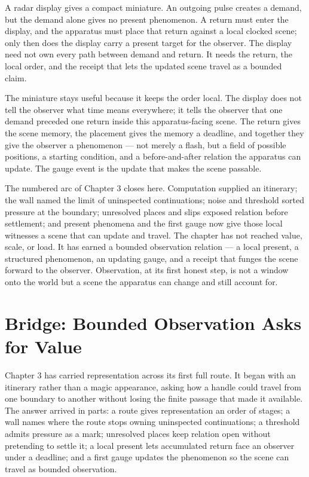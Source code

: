 A radar display gives a compact miniature. An outgoing pulse creates a demand, but the demand alone gives no present phenomenon. A return must enter the display, and the apparatus must place that return against a local clocked scene; only then does the display carry a present target for the observer. The display need not own every path between demand and return. It needs the return, the local order, and the receipt that lets the updated scene travel as a bounded claim.

The miniature stays useful because it keeps the order local. The display does not tell the observer what time means everywhere; it tells the observer that one demand preceded one return inside this apparatus-facing scene. The return gives the scene memory, the placement gives the memory a deadline, and together they give the observer a phenomenon --- not merely a flash, but a field of possible positions, a starting condition, and a before-and-after relation the apparatus can update. The gauge event is the update that makes the scene passable.

The numbered arc of Chapter 3 closes here. Computation supplied an itinerary; the wall named the limit of uninspected continuations; noise and threshold sorted pressure at the boundary; unresolved places and slips exposed relation before settlement; and present phenomena and the first gauge now give those local witnesses a scene that can update and travel. The chapter has not reached value, scale, or load. It has earned a bounded observation relation --- a local present, a structured phenomenon, an updating gauge, and a receipt that funges the scene forward to the observer. Observation, at its first honest step, is not a window onto the world but a scene the apparatus can change and still account for.

\section*{Bridge: Bounded Observation Asks for Value}

Chapter 3 has carried representation across its first full route. It began with an itinerary rather than a magic appearance, asking how a handle could travel from one boundary to another without losing the finite passage that made it available. The answer arrived in parts: a route gives representation an order of stages; a wall names where the route stops owning uninspected continuations; a threshold admits pressure as a mark; unresolved places keep relation open without pretending to settle it; a local present lets accumulated return face an observer under a deadline; and a first gauge updates the phenomenon so the scene can travel as bounded observation.

